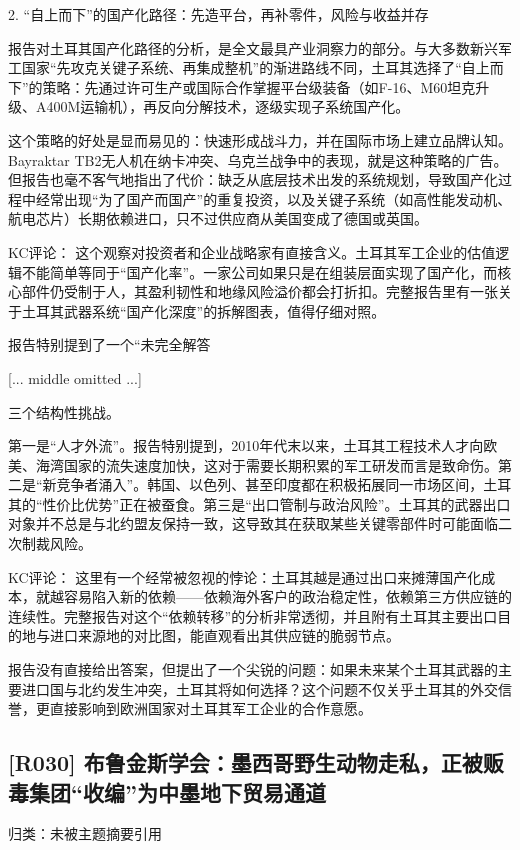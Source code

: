 \documentclass[11pt]{ctexart}
\begin{document}
2. “自上而下”的国产化路径：先造平台，再补零件，风险与收益并存

报告对土耳其国产化路径的分析，是全文最具产业洞察力的部分。与大多数新兴军工国家“先攻克关键子系统、再集成整机”的渐进路线不同，土耳其选择了“自上而下”的策略：先通过许可生产或国际合作掌握平台级装备（如F-16、M60坦克升级、A400M运输机），再反向分解技术，逐级实现子系统国产化。

这个策略的好处是显而易见的：快速形成战斗力，并在国际市场上建立品牌认知。Bayraktar TB2无人机在纳卡冲突、乌克兰战争中的表现，就是这种策略的广告。但报告也毫不客气地指出了代价：缺乏从底层技术出发的系统规划，导致国产化过程中经常出现“为了国产而国产”的重复投资，以及关键子系统（如高性能发动机、航电芯片）长期依赖进口，只不过供应商从美国变成了德国或英国。

KC评论： 这个观察对投资者和企业战略家有直接含义。土耳其军工企业的估值逻辑不能简单等同于“国产化率”。一家公司如果只是在组装层面实现了国产化，而核心部件仍受制于人，其盈利韧性和地缘风险溢价都会打折扣。完整报告里有一张关于土耳其武器系统“国产化深度”的拆解图表，值得仔细对照。

报告特别提到了一个“未完全解答

[... middle omitted ...]

三个结构性挑战。

第一是“人才外流”。报告特别提到，2010年代末以来，土耳其工程技术人才向欧美、海湾国家的流失速度加快，这对于需要长期积累的军工研发而言是致命伤。第二是“新竞争者涌入”。韩国、以色列、甚至印度都在积极拓展同一市场区间，土耳其的“性价比优势”正在被蚕食。第三是“出口管制与政治风险”。土耳其的武器出口对象并不总是与北约盟友保持一致，这导致其在获取某些关键零部件时可能面临二次制裁风险。

KC评论： 这里有一个经常被忽视的悖论：土耳其越是通过出口来摊薄国产化成本，就越容易陷入新的依赖——依赖海外客户的政治稳定性，依赖第三方供应链的连续性。完整报告对这个“依赖转移”的分析非常透彻，并且附有土耳其主要出口目的地与进口来源地的对比图，能直观看出其供应链的脆弱节点。

报告没有直接给出答案，但提出了一个尖锐的问题：如果未来某个土耳其武器的主要进口国与北约发生冲突，土耳其将如何选择？这个问题不仅关乎土耳其的外交信誉，更直接影响到欧洲国家对土耳其军工企业的合作意愿。

\subsection{[R030] 布鲁金斯学会：墨西哥野生动物走私，正被贩毒集团“收编”为中墨地下贸易通道}
{\small\color{refgray}归类：未被主题摘要引用}
\end{document}

